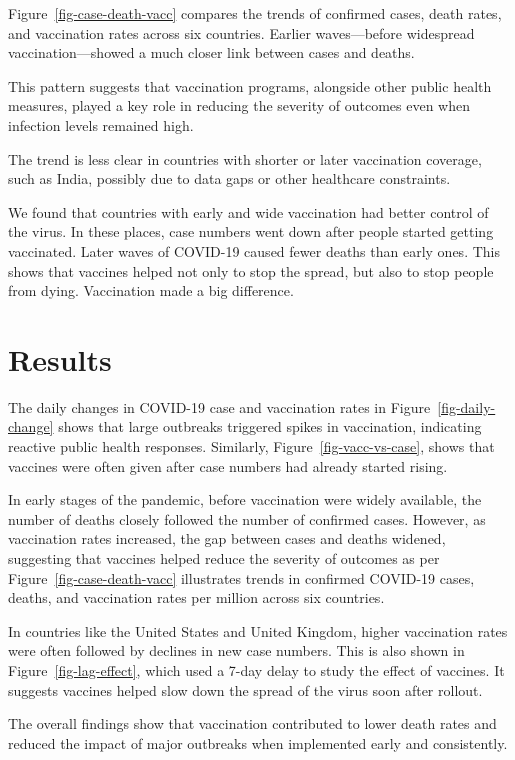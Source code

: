 \documentclass[
  11pt,
]{article}
\begin{document}
Figure~\ref{fig-case-death-vacc} compares the trends of confirmed cases,
death rates, and vaccination rates across six countries. Earlier
waves---before widespread vaccination---showed a much closer link
between cases and deaths.

This pattern suggests that vaccination programs, alongside other public
health measures, played a key role in reducing the severity of outcomes
even when infection levels remained high.

The trend is less clear in countries with shorter or later vaccination
coverage, such as India, possibly due to data gaps or other healthcare
constraints.

We found that countries with early and wide vaccination had better
control of the virus. In these places, case numbers went down after
people started getting vaccinated. Later waves of COVID-19 caused fewer
deaths than early ones. This shows that vaccines helped not only to stop
the spread, but also to stop people from dying. Vaccination made a big
difference.

\section{Results}\label{sec-results}

The daily changes in COVID-19 case and vaccination rates in
Figure~\ref{fig-daily-change} shows that large outbreaks triggered
spikes in vaccination, indicating reactive public health responses.
Similarly, Figure~\ref{fig-vacc-vs-case}, shows that vaccines were often
given after case numbers had already started rising.

In early stages of the pandemic, before vaccination were widely
available, the number of deaths closely followed the number of confirmed
cases. However, as vaccination rates increased, the gap between cases
and deaths widened, suggesting that vaccines helped reduce the severity
of outcomes as per Figure~\ref{fig-case-death-vacc} illustrates trends
in confirmed COVID-19 cases, deaths, and vaccination rates per million
across six countries.

In countries like the United States and United Kingdom, higher
vaccination rates were often followed by declines in new case numbers.
This is also shown in Figure~\ref{fig-lag-effect}, which used a 7-day
delay to study the effect of vaccines. It suggests vaccines helped slow
down the spread of the virus soon after rollout.

The overall findings show that vaccination contributed to lower death
rates and reduced the impact of major outbreaks when implemented early
and consistently.
\end{document}
